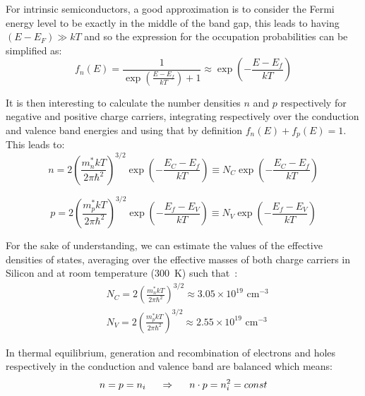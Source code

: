 		For intrinsic semiconductors, a good approximation is to consider the Fermi energy level to be exactly in the middle of the band gap, this leads to having $(E-E_F) \gg kT$ and so  the expression for the occupation probabilities can be simplified as:
		\begin{equation}
			f_n(E) = \frac{1}{\exp(\frac{E-E_f}{kT}) + 1} \approx \exp(- \frac{E-E_f}{kT})
		\end{equation}

		It is then interesting to calculate the number densities $n$ and $p$ respectively for negative and positive charge carriers, integrating respectively over the conduction and valence band energies and using that by definition $f_n(E) + f_p(E) = 1$. This leads to: 
		\begin{equation}
			n = 2{\left( \frac{m_n^* kT}{2 \pi \hbar^2} \right)}^{3/2} \exp(-\frac{E_C - E_f}{kT}) \equiv N_C \exp(-\frac{E_C - E_f}{kT})
			\label{eq:ndensities_n}
		\end{equation}

		\begin{equation}
			p = 2{\left( \frac{m_p^* kT}{2 \pi \hbar^2} \right)}^{3/2} \exp(-\frac{E_f - E_V}{kT}) \equiv N_V \exp(-\frac{E_f - E_V}{kT})
			\label{eq:ndensities_p}
		\end{equation}

		For the sake of understanding, we can estimate the values of the effective densities of states, averaging over the effective masses of both charge carriers in Silicon and at room temperature (\SI{300}{\kelvin}) such that\ \cite{leroy2012silicon}: 
		\begin{equation}
			\begin{split}
				& N_C = 2 {\left( \frac{m_n^* kT}{2 \pi \hbar^2} \right)}^{3/2} \approx 3.05 \times 10^{19} \text{ cm$^{-3}$} \\
				& N_V = 2 {\left( \frac{m_p^* kT}{2 \pi \hbar^2} \right)}^{3/2} \approx 2.55 \times 10^{19} \text{ cm$^{-3}$}
			\end{split}
			\label{eq:effdensities}
		\end{equation}

		In thermal equilibrium, generation and recombination of electrons and holes respectively in the conduction and valence band are balanced which means: 
		\begin{equation}
			n = p = n_i \hspace{5mm} \Rightarrow \hspace{5mm} n \cdot p = n_i^2 = const
			\label{eq:massaction}
		\end{equation}


